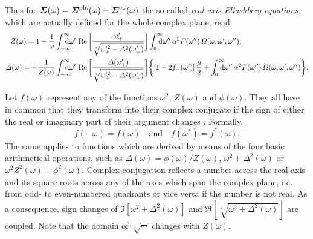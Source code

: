 Thus for $\boldsymbol {\varSigma}(\omega) = \boldsymbol {\varSigma} \sp{\text{ph.}}(\omega) + \boldsymbol {\varSigma}
\sp{\text{el.}}(\omega)$ the so-called \emph{real-axis Eliashberg equations}, which
are actually defined for the whole complex plane, read
%
\begin{align*}
    Z(\omega) = 1 - \frac 1 \omega
    &\int \from{-\infty} \till \infty \D \omega' \,
    \Re \bigg[
        \frac{\omega'_+}{\sqrt[*]{\omega'^2_+ - \Delta^2(\omega'_+)}}
    \bigg] \int \from 0 \till \infty \D \omega'' \, \alpha^2 F(\omega'') \,
    \Omega(\omega, \omega', \omega''),
    \\
    \Delta(\omega) = -\frac 1 {Z(\omega)}
    &\int \from{-\infty} \till \infty \D \omega' \,
    \Re \bigg[
        \frac{\Delta(\omega'_+)}{\sqrt[*]{\omega'^2_+ - \Delta^2(\omega'_+)}}
    \bigg]
    \bigg \{
        [1 - 2 f_+(\omega')] \, \frac \mu 2
        + \int \from 0 \till \infty \D \omega'' \, \alpha^2 F(\omega'') \,
        \Omega(\omega, \omega', \omega'')
    \bigg \}.
\end{align*}

Let $f(\omega)$ represent any of the functions $\omega^2$, $Z(\omega)$ and
$\phi(\omega)$. They all have in common that they transform into their complex
conjugate if the sign of either the real or imaginary part of their argument
changes \cite[Eq.~A5]{AmbegaokarTewordt64}. Formally,
%
\begin{equation*}
    f(-\omega) = f(\omega) \quad \text{and} \quad f(\omega^*) = f^*(\omega).
\end{equation*}
%
The same applies to functions which are derived by means of the four basic
arithmetical operations, such as $\Delta(\omega) = \phi(\omega) / Z(\omega)$,
$\omega^2 + \Delta^2(\omega)$ or $\omega^2 Z^2(\omega) + \phi^2(\omega)$.
Complex conjugation reflects a number across the real axis and its square roots
across any of the axes which span the complex plane, i.e. from odd- to
even-numbered quadrants or vice versa if the number is not real. As a
consequence, sign changes of $\Im[\omega^2 + \Delta^2(\omega)]$ and
$\Re[\sqrt[*]{\omega^2 + \Delta^2(\omega)}]$ are coupled. Note that the domain
of $\sqrt[*] \cdots$ changes with $Z(\omega)$.


